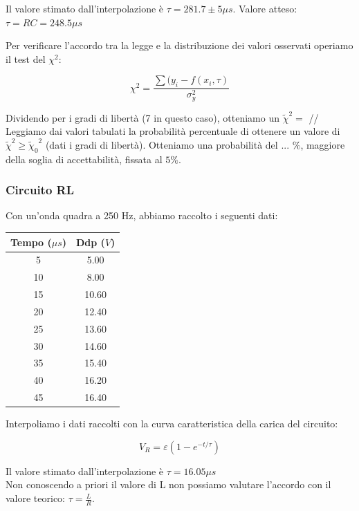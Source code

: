 Il valore stimato dall'interpolazione è $\tau=281.7 \pm 5 \mu s$.
Valore atteso: $\tau=RC=248.5 \mu s$

Per verificare l'accordo tra la legge e la distribuzione dei valori osservati operiamo il test del $\chi^2$:

$$ \chi^2 = \frac{\sum{(y_i - f(x_i,\tau )}}{\sigma_y^2} $$

Dividendo per i gradi di libertà (7 in questo caso), otteniamo un $\tilde{\chi}^2 = $ //
Leggiamo dai valori tabulati la probabilità percentuale di ottenere un valore di $\tilde{\chi}^2 \geq {\tilde{\chi}_0}^2 $ (dati i gradi di libertà). Otteniamo una probabilità del ... $\%$, maggiore della soglia di accettabilità, fissata al $5\%$. 


\subsubsection{Circuito RL}
Con un'onda quadra a 250 Hz, abbiamo raccolto i seguenti dati:

\begin{center}
\begin{tabular}{*{2}{c}}
Tempo ($\mu s$) & Ddp ($V$) \\
\midrule
5 & 5.00 \\
10 & 8.00 \\
15 & 10.60 \\
20 & 12.40 \\
25 & 13.60 \\
30 & 14.60 \\
35 & 15.40 \\
40 & 16.20 \\
45 & 16.40 \\
\end{tabular}
\end{center}
Interpoliamo i dati raccolti con la curva caratteristica della carica del circuito:

$$V_R = \varepsilon \left( 1-e^{-t/\tau} \right)$$

Il valore stimato dall'interpolazione è $\tau=16.05 \mu s$ \\
Non conoscendo a priori il valore di L non possiamo valutare l'accordo con il valore teorico: $\tau=\frac{L}{R}$.

